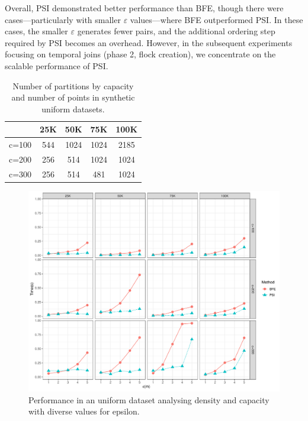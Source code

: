 Overall, PSI demonstrated better performance than BFE, though there were cases—particularly with smaller $\varepsilon$ values—where BFE outperformed PSI. In these cases, the smaller $\varepsilon$ generates fewer pairs, and the additional ordering step required by PSI becomes an overhead. However, in the subsequent experiments focusing on temporal joins (phase 2, flock creation), we concentrate on the scalable performance of PSI.

\begin{table}
    \centering
    \caption{Number of partitions by capacity and number of points in synthetic uniform datasets.}
    \label{tab:uniform_ncells}
    \begin{tabular}{c|cccc}
              & 25K & 50K  & 75K  & 100K \\
        \hline
        c=100 & 544 & 1024 & 1024 & 2185 \\
        c=200 & 256 & 514  & 1024 & 1024 \\
        c=300 & 256 & 514  & 481  & 1024 \\
    \end{tabular}
\end{table}

\begin{figure}
    \centering
    \includegraphics[width=\linewidth]{figures/plots/05_uniform_performance/uniform_performance.pdf}
    \caption{Performance in an uniform dataset analysing density and capacity with diverse values for epsilon.}\label{fig:uniform_performance}
\end{figure}

